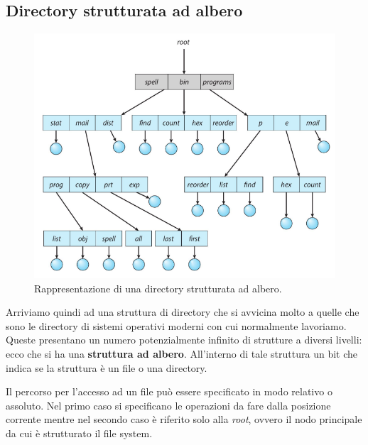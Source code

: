 % 
\subsection{Directory strutturata ad albero}
\begin{figure}[h]
    \centering
    \includegraphics[width = .6\textwidth]{../res/imgs/file system interface/tree-structured dir.png}
    \caption{Rappresentazione di una directory strutturata ad albero.}
    \label{fig:tree-structured dir}
\end{figure}
Arriviamo quindi ad una struttura di directory che si avvicina molto a quelle che sono le directory di sistemi operativi moderni con cui normalmente lavoriamo. Queste presentano un numero potenzialmente infinito di strutture a diversi livelli: ecco che si ha una \textbf{struttura ad albero}. All'interno di tale struttura un bit che indica se la struttura è un file o una directory. 

Il percorso per l'accesso ad un file può essere specificato in modo relativo o assoluto. Nel primo caso si specificano le operazioni da fare dalla posizione corrente mentre nel secondo caso è riferito solo alla \textit{root}, ovvero il nodo principale da cui è strutturato il file system.

